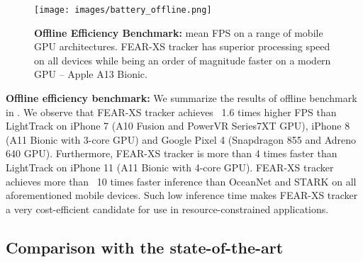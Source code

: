 \documentclass[runningheads]{llncs}
\begin{document}
\begin{figure}[t!]\centering
  \texttt{[image: images/battery\_offline.png]}
\caption{\textbf{Offline Efficiency Benchmark:} mean FPS on a range of mobile GPU architectures. FEAR-XS tracker has superior processing speed on all devices while being an order of magnitude faster on a modern GPU -- Apple A13 Bionic. 
}
  \label{fig:battery-offline}
\end{figure}

\textbf{Offline efficiency benchmark:} We summarize the results of offline benchmark in . 
We observe that FEAR-XS tracker achieves ~1.6 times higher FPS than LightTrack \cite{LightTrack} on iPhone 7 (A10 Fusion and PowerVR Series7XT GPU), iPhone 8 (A11 Bionic with 3-core GPU) and Google Pixel 4 (Snapdragon 855 and Adreno 640 GPU). 
Furthermore, FEAR-XS tracker is more than 4 times faster than LightTrack on iPhone 11 (A11 Bionic with 4-core GPU). 
FEAR-XS tracker achieves more than ~10 times faster inference than OceanNet \cite{Ocean} and STARK \cite{STARK} on all aforementioned mobile devices. 
Such low inference time makes FEAR-XS tracker a very cost-efficient candidate for use in resource-constrained applications.






\subsection{Comparison with the state-of-the-art}
\end{document}

